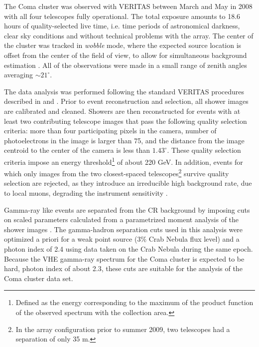 \documentclass[12pt,manuscript]{aastex}
\begin{document}
The Coma cluster was observed with VERITAS between March and May in 2008 with all four telescopes
fully operational. The total exposure amounts to 18.6 hours of quality-selected live time, i.e.
time periods of astronomical darkness, clear sky conditions and without technical problems with the
array. The center of the cluster was tracked in \emph{wobble} mode, where the expected source
location is offset from the center of the field of view, to allow for simultaneous background
estimation \citep{article:Formin_etal:1994}. All of the observations were made in a small range of
zenith angles averaging $\sim 21^{\circ}$.

The data analysis was performed following the standard VERITAS procedures described in
\citet{inproc:Cogan_etal:2007} and \citet{inproc:Daniel_etal:2007}. Prior to event reconstruction
and selection, all shower images are calibrated and cleaned. Showers are then reconstructed for
events with at least two contributing telescope images that pass the following quality selection
criteria: more than four participating pixels in the camera, number of photoelectrons in the image
is larger than 75, and the distance from the image centroid to the center of the camera is less
than $1.43^{\circ}$. These quality selection criteria impose an energy threshold\footnote{Defined
as the energy corresponding to the maximum of the product function of the observed spectrum with
the collection area.} of about 220 GeV. In addition, events for which only images from the two
closest-spaced telescopes\footnote{In the array configuration prior to summer 2009, two telescopes 
had a separation of only 35 m.} survive quality selection are rejected, as they introduce an
irreducible high background rate, due to local muons, degrading the instrument sensitivity
\citep{article:MaierKnapp:2007}.

Gamma-ray like events are separated from the CR background by imposing cuts on scaled parameters
\citep{article:Aharonian_etal:1997, article:Krawczynski_etal:2006} calculated from a parametrized
moment analysis of the shower images \citep{inproc:Hillas:1985}. The gamma-hadron separation cuts
used in this analysis were optimized a priori for a weak point source (3\% Crab Nebula flux level)
and a photon index of 2.4 using data taken on the Crab Nebula during the same epoch. Because the
VHE gamma-ray spectrum for the Coma cluster is expected to be hard, photon index of about 2.3,
these cuts are suitable for the analysis of the Coma cluster data set. 
\end{document}
